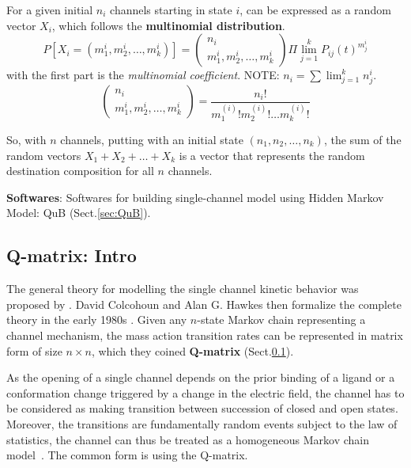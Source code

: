 For a given initial $n_i$ channels starting in state $i$, can be expressed as a
random vector $X_i$, which follows the {\bf multinomial distribution}.
\begin{equation}
P[X_i = (m^i_1, m^i_2, \ldots, m^i_k)] = \left( \begin{array}{c} n_i
\\ m^i_1, m^i_2, \ldots, m^i_k \end{array} \right) \Pi\lim_{j=1}^k
P_{ij}(t)^{m^i_j}
\end{equation}
with the first part is the {\it multinomial coefficient}. NOTE:
$n_i = \sum\lim_{j=1}^k n^i_j$.
\begin{equation}
\left( \begin{array}{c} n_i
\\ m^i_1, m^i_2, \ldots, m^i_k \end{array} \right) = \frac{n_i !}{m_1^{(i)}!
m_2^{(i)}!\ldots m_k^{(i)}!}
\end{equation}

So, with $n$ channels, putting with an initial state $(n_1,n_2, \ldots,n_k)$,
the sum of the random vectors $X_1+X_2+\ldots+X_k$ is a vector that represents
the random destination composition for all $n$ channels.



{\bf Softwares}: Softwares for building single-channel model using Hidden Markov
Model: QuB (Sect.\ref{sec:QuB}).


\subsection{Q-matrix: Intro}
\label{sec:Q-matrix}

The general theory for modelling the single channel kinetic behavior was
proposed by \citep{colquhoun1977rfm}. David Colcohoun and Alan G. Hawkes then
formalize the complete theory in the early 1980s \citep{colquhoun1982osp}. Given
any $n$-state Markov chain representing a channel mechanism, the mass action
transition rates can be represented in matrix form of size $n\times n$, which
they coined {\bf Q-matrix} (Sect.\ref{sec:Q-matrix}).

As the opening of a single channel depends on the prior binding of a ligand or a
conformation change triggered by a change in the electric field, the channel has
to be considered as making transition between succession of closed and open
states. Moreover, the transitions are fundamentally random events subject to the
law of statistics, the channel can thus be treated as a homogeneous Markov chain
model~\citep{colquhoun1977rfm,keynes1985mbb}. The common form is using the
Q-matrix.

